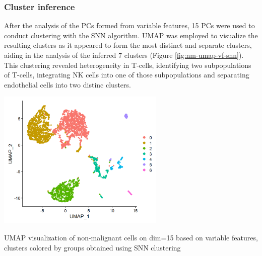 \documentclass[11pt]{article}
\begin{document}
\begin{multicols}{2}
    \subsubsection{Cluster inference}
    \noindent
    After the analysis of the PCs formed from variable features, 15 PCs were used to conduct clustering with the SNN algorithm. UMAP was employed to visualize the resulting clusters as it appeared to form the most distinct and separate clusters, aiding in the analysis of the inferred 7 clusters (Figure \ref{fig:nm-umap-vf-snn}). This clustering revealed heterogeneity in T-cells, identifying two subpopulations of T-cells, integrating NK cells into one of those subpopulations and separating endothelial cells into two distinc clusters.

    \begin{center}
        \captionsetup{type=figure}
        \includegraphics[width=8cm]{plots/plot_nm-umap-vf-snn.png}
        \caption{UMAP visualization of non-malignant cells on dim=15 based on variable features, clusters colored by groups obtained using SNN clustering}
        \label{fig:nm-umap-vf-snn}
    \end{center}

\end{multicols}
\end{document}
